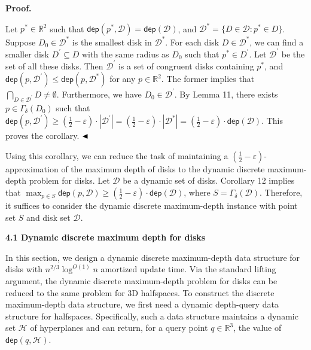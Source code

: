 \documentclass[10pt,a4paper]{article}
\begin{document}
\par
\par
\par\medskip\noindent\textbf{Proof.}\par
Let $p^{*}\in\mathbb{R}^{2}$ such that $\mathsf{dep}(p^{*},\mathcal{D})=\mathsf{dep}(\mathcal{D})$, and $\mathcal{D}^{*}=\{D\in\mathcal{D}:p^{*}\in D\}$. Suppose $D_{0}\in\mathcal{D}^{*}$ is the smallest disk in $\mathcal{D}^{*}$. For each disk $D\in\mathcal{D}^{*}$, we can find a smaller disk $D^{\prime}\subseteq D$ with the same radius as $D_{0}$ such that $p^{*}\in D^{\prime}$. Let $\mathcal{D}^{\prime}$ be the set of all these disks. Then $\mathcal{D}^{\prime}$ is a set of congruent disks containing $p^{*}$, and $\mathsf{dep}(p,\mathcal{D}^{\prime})\leq\mathsf{dep}(p,\mathcal{D}^{*})$ for any $p\in\mathbb{R}^{2}$. The former implies that $\bigcap_{D\in\mathcal{D}^{\prime}}D\neq\emptyset$. Furthermore, we have $D_{0}\in\mathcal{D}^{\prime}$. By Lemma 11, there exists $p\in\varGamma_{\delta}(D_{0})$ such that $\mathsf{dep}(p,\mathcal{D}^{\prime})\geq(\frac{1}{2}-\varepsilon)\cdot|%
\mathcal{D}^{\prime}|=(\frac{1}{2}-\varepsilon)\cdot|\mathcal{D}^{*}|=(\frac{1%
}{2}-\varepsilon)\cdot\mathsf{dep}(\mathcal{D})$. This proves the corollary. $\hfill\blacktriangleleft$
\par
\par
Using this corollary, we can reduce the task of maintaining a $(\frac{1}{2}-\varepsilon)$-approximation of the maximum depth of disks to the dynamic discrete maximum-depth problem for disks. Let $\mathcal{D}$ be a dynamic set of disks. Corollary 12 implies that $\max_{p\in S}\mathsf{dep}(p,\mathcal{D})\geq(\frac{1}{2}-\varepsilon)\cdot%
\mathsf{dep}(\mathcal{D})$, where $S=\varGamma_{\delta}(\mathcal{D})$. Therefore, it suffices to consider the dynamic discrete maximum-depth instance with point set $S$ and disk set $\mathcal{D}$.
\par
\par
\par\medskip\noindent\textbf{4.1 Dynamic discrete maximum depth for disks}\par
In this section, we design a dynamic discrete maximum-depth data structure for disks with $n^{2/3}\log^{O(1)}n$ amortized update time. Via the standard lifting argument, the dynamic discrete maximum-depth problem for disks can be reduced to the same problem for 3D halfspaces. To construct the discrete maximum-depth data structure, we first need a dynamic depth-query data structure for halfspaces. Specifically, such a data structure maintains a dynamic set $\mathcal{H}$ of hyperplanes and can return, for a query point $q\in\mathbb{R}^{3}$, the value of $\mathsf{dep}(q,\mathcal{H})$.
\end{document}
